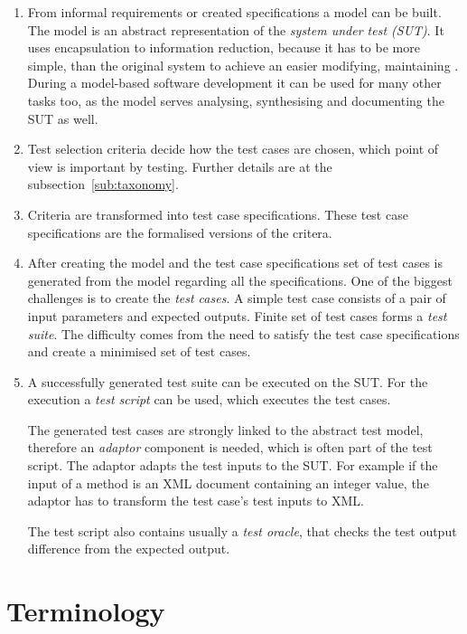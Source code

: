 \begin{enumerate}
    \item From informal requirements or created specifications a model can be built. The model is an abstract representation of the \textit{system under test (SUT)}. It uses encapsulation to information reduction, because it has to be more simple, than the original system to achieve an easier modifying, maintaining \cite{mbttestcasegeneration}. During a model-based software development it can be used for many other tasks too, as the model serves analysing, synthesising and documenting the SUT as well.
     \item Test selection criteria decide how the test cases are chosen, which point of view is important by testing. Further details are at the subsection~\ref{sub:taxonomy}.
     \item Criteria are transformed into test case specifications. These test case specifications are the formalised versions of the critera.
     \item After creating the model and the test case specifications set of test cases is generated from the model regarding all the specifications. One of the biggest challenges is to create the \textit{test cases}. A simple test case consists of a pair of input parameters and expected outputs. Finite set of test cases forms a \textit{test suite}. The difficulty comes from the need to satisfy the test case specifications and create a minimised set of test cases.
     \item A successfully generated test suite can be executed on the SUT. For the execution a \textit{test script} can be used, which executes the test cases.
     
     The generated test cases are strongly linked to the abstract test model, therefore an \textit{adaptor} component is needed, which is often part of the test script. The adaptor adapts the test inputs to the SUT. For example if the input of a method is an XML document containing an integer value, the adaptor has to transform the test case's test inputs to XML.
     
     The test script also contains usually a \textit{test oracle}, that checks the test output difference from the expected output.
\end{enumerate}

\section{Terminology}
\label{sec:terminology}

